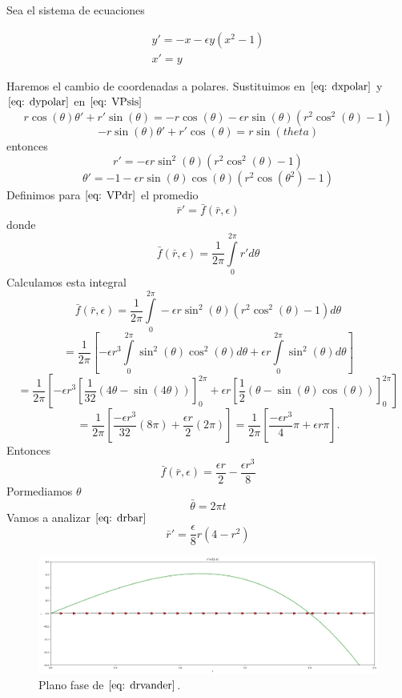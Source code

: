 \documentclass[12pt, a4paper]{report}
\begin{document}
Sea el sistema de ecuaciones

\begin{equation}\label{eq: VPsis}
	\begin{matrix}
		y'=-x-\epsilon y(x^2-1) \\
		x'=y
	\end{matrix}
\end{equation}

Haremos el cambio de coordenadas a polares.
Sustituimos en $\eqref{eq: dxpolar}$ y $\eqref{eq: dypolar}$ en $\eqref{eq: VPsis}$
$$r\cos(\theta)\theta'+r'\sin(\theta)=-r\cos(\theta)-\epsilon r\sin(\theta)(r^2\cos^2(\theta)-1)$$
$$-r\sin(\theta)\theta'+r'\cos(\theta)=r\sin(theta)$$
entonces
\begin{equation}\label{eq: VPdr}
	r'=-\epsilon r\sin^2(\theta)(r^2\cos^2(\theta)-1)
\end{equation}
\begin{equation}\label{eq: VPdtheta}
	\theta'=-1-\epsilon r\sin(\theta)\cos(\theta)(r^2\cos(\theta^2)-1)
\end{equation}
Definimos para $\eqref{eq: VPdr}$ el promedio
\begin{equation}\label{eq: drbar}
	\bar{r}'=\bar{f}(\bar{r},\epsilon)
\end{equation}
donde
$$\bar{f}(\bar{r},\epsilon)=\frac{1}{2\pi}\int\limits_0^{2\pi}r'd\theta$$
Calculamos esta integral
$$\bar{f}(\bar{r},\epsilon)=\frac{1}{2\pi}\int\limits_0^{2\pi}-\epsilon r\sin^2(\theta)(r^2\cos^2(\theta)-1)d\theta$$
$$=\frac{1}{2\pi}[-\epsilon r^3\int\limits_0^{2\pi}\sin^2(\theta)\cos^2(\theta)d\theta+\epsilon r\int\limits_0^{2\pi}\sin^2(\theta)d\theta]$$
$$=\frac{1}{2\pi}[-\epsilon r^3[\frac{1}{32}(4\theta-\sin(4\theta))]_0^{2\pi}+\epsilon r[\frac{1}{2}(\theta-\sin(\theta)\cos(\theta))]_0^{2\pi}]$$
$$=\frac{1}{2\pi}[\frac{-\epsilon r^3}{32}(8\pi)+\frac{\epsilon r}{2}(2\pi)]=\frac{1}{2\pi}[\frac{-\epsilon r^3}{4}\pi+\epsilon r\pi].$$
Entonces
$$\bar{f}(\bar{r},\epsilon)=\frac{\epsilon r}{2}-\frac{\epsilon r^3}{8}$$
Pormediamos $\theta$
$$\bar{\theta}=2\pi t$$
Vamos a analizar $\eqref{eq: drbar}$
\begin{equation}\label{eq: drvander}
	\bar{r}'=\frac{\epsilon}{8}r(4-r^2)
\end{equation}
\begin{figure}[h]
	\centering
	\includegraphics[width=14cm]{graficavanderpol.png}
	\caption{Plano fase de $\eqref{eq: drvander}$.}
\end{figure}
\end{document}
